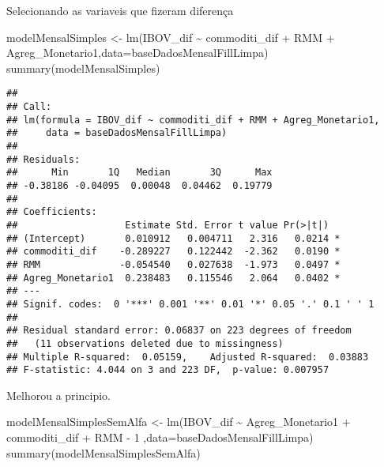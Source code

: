 \documentclass[
]{article}
\newenvironment{Shaded}{\begin{snugshade}}{\end{snugshade}}
\newcommand{\AttributeTok}[1]{\textcolor[rgb]{0.77,0.63,0.00}{#1}}
\newcommand{\DecValTok}[1]{\textcolor[rgb]{0.00,0.00,0.81}{#1}}
\newcommand{\FunctionTok}[1]{\textcolor[rgb]{0.00,0.00,0.00}{#1}}
\newcommand{\NormalTok}[1]{#1}
\newcommand{\OtherTok}[1]{\textcolor[rgb]{0.56,0.35,0.01}{#1}}
\newcommand{\SpecialCharTok}[1]{\textcolor[rgb]{0.00,0.00,0.00}{#1}}
\begin{document}
Selecionando as variaveis que fizeram diferença

\begin{Shaded}
\begin{Highlighting}[]
\NormalTok{modelMensalSimples }\OtherTok{\textless{}{-}} \FunctionTok{lm}\NormalTok{(IBOV\_dif }\SpecialCharTok{\textasciitilde{}}\NormalTok{ commoditi\_dif }\SpecialCharTok{+}\NormalTok{ RMM }\SpecialCharTok{+}\NormalTok{ Agreg\_Monetario1,}\AttributeTok{data=}\NormalTok{baseDadosMensalFillLimpa)}
\FunctionTok{summary}\NormalTok{(modelMensalSimples)}
\end{Highlighting}
\end{Shaded}

\begin{verbatim}
## 
## Call:
## lm(formula = IBOV_dif ~ commoditi_dif + RMM + Agreg_Monetario1, 
##     data = baseDadosMensalFillLimpa)
## 
## Residuals:
##      Min       1Q   Median       3Q      Max 
## -0.38186 -0.04095  0.00048  0.04462  0.19779 
## 
## Coefficients:
##                   Estimate Std. Error t value Pr(>|t|)  
## (Intercept)       0.010912   0.004711   2.316   0.0214 *
## commoditi_dif    -0.289227   0.122442  -2.362   0.0190 *
## RMM              -0.054540   0.027638  -1.973   0.0497 *
## Agreg_Monetario1  0.238483   0.115546   2.064   0.0402 *
## ---
## Signif. codes:  0 '***' 0.001 '**' 0.01 '*' 0.05 '.' 0.1 ' ' 1
## 
## Residual standard error: 0.06837 on 223 degrees of freedom
##   (11 observations deleted due to missingness)
## Multiple R-squared:  0.05159,    Adjusted R-squared:  0.03883 
## F-statistic: 4.044 on 3 and 223 DF,  p-value: 0.007957
\end{verbatim}

Melhorou a principio.

\begin{Shaded}
\begin{Highlighting}[]
\NormalTok{modelMensalSimplesSemAlfa }\OtherTok{\textless{}{-}} \FunctionTok{lm}\NormalTok{(IBOV\_dif }\SpecialCharTok{\textasciitilde{}}\NormalTok{ Agreg\_Monetario1 }\SpecialCharTok{+}\NormalTok{ commoditi\_dif }\SpecialCharTok{+}\NormalTok{ RMM  }\SpecialCharTok{{-}} \DecValTok{1}\NormalTok{ ,}\AttributeTok{data=}\NormalTok{baseDadosMensalFillLimpa)}
\FunctionTok{summary}\NormalTok{(modelMensalSimplesSemAlfa)}
\end{Highlighting}
\end{Shaded}
\end{document}
